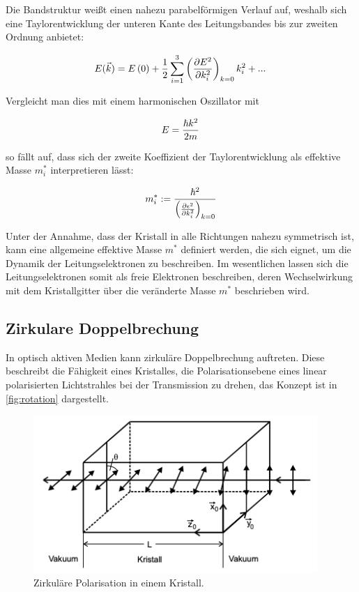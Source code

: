 Die Bandstruktur weißt einen nahezu parabelförmigen Verlauf auf, weshalb sich eine Taylorentwicklung der unteren Kante des
Leitungsbandes bis zur zweiten Ordnung anbietet:

\begin{equation}
    E(\vec{k})=E\left(0\right)+\frac{1}{2}\sum_{i=1}^3\left(\frac{\partial E^2}{\partial k_i^2}\right)_{k=0}k_i^2+...\,
    \notag
\end{equation}
 
Vergleicht man dies mit einem harmonischen Oszillator mit

\begin{equation}
    E=\frac{\hbar k^2}{2m}\,
    \notag
\end{equation}

so fällt auf, dass sich der zweite Koeffizient der Taylorentwicklung als effektive Masse $m_i^*$ interpretieren lässt:
    
\begin{equation}
    m_i^*:=\frac{\hbar^2}{\left(\frac{\partial\epsilon^2}{\partial k_i^2}\right)_{k=0}}
    \notag
\end{equation}

Unter der Annahme, dass der Kristall in alle Richtungen nahezu symmetrisch ist, kann eine allgemeine effektive Masse
$m^*$ definiert werden, die sich eignet, um die Dynamik der Leitungselektronen zu beschreiben. Im wesentlichen
lassen sich die Leitungselektronen somit als freie Elektronen beschreiben, deren Wechselwirkung mit dem Kristallgitter
über die veränderte Masse $m^*$ beschrieben wird.

\subsection{Zirkulare Doppelbrechung}
\label{sec:Faraday}

In optisch aktiven Medien kann zirkuläre Doppelbrechung auftreten. Diese beschreibt die
Fähigkeit eines Kristalles, die Polarisationsebene eines linear polarisierten Lichtstrahles bei der Transmission zu drehen, das Konzept ist in 
\autoref{fig:rotation} dargestellt.

\begin{figure} [H]
    \centering
    \includegraphics[height=6cm]{content/rotation.png}
    \caption{Zirkuläre Polarisation in einem Kristall. \cite{V46Anhang}}
    \label{fig:rotation}
\end{figure}

